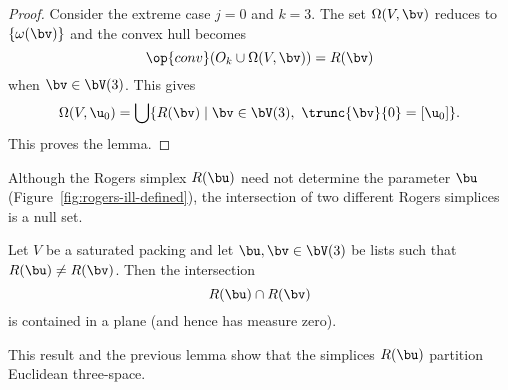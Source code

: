 \begin{proof}
Consider the extreme case $j=0$ and $k=3$.  The set $\Omega(V,\bv)$
reduces to $\{\omega(\bv)\}$ and the convex hull becomes
\[  
\op{conv}(O_{k}\cup \Omega(V,\bv)) = R(\bv)
\] 
when $\bv\in \bV(3)$.
This gives
\begin{equation} 
\Omega(V,\u_0) = 
\bigcup \{ R(\bv) \mid \bv\in \bV(3),~\trunc{\bv}{0} =[\u_0]\}.
\end{equation}
This proves the lemma.
\end{proof}



\figELMXAFH %

Although the Rogers simplex $R(\bu)$ need not determine the parameter
$\bu$ (Figure~\ref{fig:rogers-ill-defined}), the intersection of two
different Rogers simplices is a null set.

\begin{lemma}  \label{lemma:R-inter} 
  Let $V$ be a saturated packing and let $\bu,\bv\in \bV(3)$ be lists
  such that $R(\bu)\ne R(\bv)$.  Then the intersection
\[  
R(\bu)\cap R(\bv)
\] 
is contained in a plane (and hence has measure zero).
\end{lemma}

This result and the previous lemma show that the simplices $R(\bu)$
partition Euclidean three-space.

